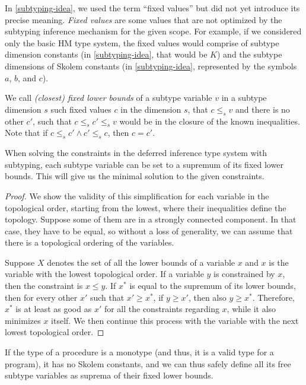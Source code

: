 In \cref{subtyping-idea}, we used the term ``fixed values'' but did not yet introduce its precise meaning. \emph{Fixed values} are some values that are not optimized by the subtyping inference mechanism for the given scope. For example, if we considered only the basic HM type system, the fixed values would comprise of subtype dimension constants (in \cref{subtyping-idea}, that would be $K$) and the subtype dimensions of Skolem constants (in \cref{subtyping-idea}, represented by the symbols $a$, $b$, and $c$).

We call \emph{(closest) fixed lower bounds} of a subtype variable $v$ in a subtype dimension $s$ such fixed values $c$ in the dimension $s$, that $c \leq_s v$ and there is no other $c'$, such that $c \leq_s c' \leq_s v$ would be in the closure of the known inequalities. Note that if $c \leq_s c' \land c' \leq_s c$, then $c = c'$.

\begin{lemma} When solving the constraints in the deferred inference type system with subtyping, each subtype variable can be set to a supremum of its fixed lower bounds. This will give us the minimal solution to the given constraints.
    \label{suprema_subtyping}

    \begin{proof}
        We show the validity of this simplification for each variable in the topological order, starting from the lowest, where their inequalities define the topology. Suppose some of them are in a strongly connected component. In that case, they have to be equal, so without a loss of generality, we can assume that there is a topological ordering of the variables.

        Suppose $X$ denotes the set of all the lower bounds of a variable $x$ and $x$ is the variable with the lowest topological order. If a variable $y$ is constrained by $x$, then the constraint is $x \leq y$. If $x^\ast$ is equal to the supremum of its lower bounds, then for every other $x'$ such that $x' \geq x^\ast$, if $y \geq x'$, then also $y \geq x^\ast$. Therefore, $x^\ast$ is at least as good as $x'$ for all the constraints regarding $x$, while it also minimizes $x$ itself. We then continue this process with the variable with the next lowest topological order.
    \end{proof}

\end{lemma}

\begin{observe}
    If the type of a procedure is a monotype (and thus, it is a valid type for a program), it has no Skolem constants, and we can thus safely define all its free subtype variables as suprema of their fixed lower bounds.
\end{observe}

